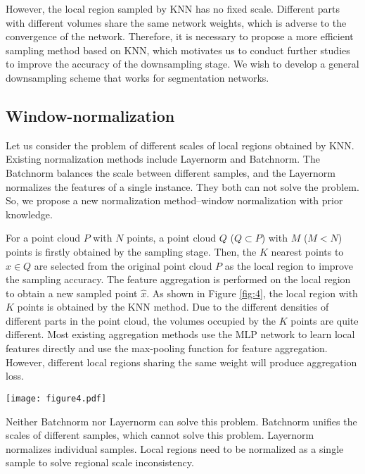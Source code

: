\documentclass[10pt,twocolumn,letterpaper]{article}
\begin{document}
        However, the local region sampled by KNN has no fixed scale. Different parts with different volumes share the same network weights, which is adverse to the convergence of the network. Therefore, it is necessary to propose a more efficient sampling method based on KNN, which motivates us to conduct further studies to improve the accuracy of the downsampling stage. We wish to develop a general downsampling scheme that works for segmentation networks.

    \subsection{Window-normalization}
        Let us consider the problem of different scales of local regions obtained by KNN. Existing normalization methods include Layernorm and Batchnorm. The Batchnorm balances the scale between different samples, and the Layernorm normalizes the features of a single instance. They both can not solve the problem. So, we propose a new normalization method--window normalization with prior knowledge.

        For a point cloud $P$ with $N$ points, a point cloud $Q$ ($Q \subset P$) with $M$ ($M<N$) points is firstly obtained by the sampling stage. Then, the $K$ nearest points to $x \in Q$ are selected from the original point cloud $P$ as the local region to improve the sampling accuracy. The feature aggregation is performed on the local region to obtain a new sampled point ${\hat x} $. As shown in Figure \ref{fig:4}, the local region with $K$ points is obtained by the KNN method. Due to the different densities of different parts in the point cloud, the volumes occupied by the $K$ points are quite different. Most existing aggregation methods use the MLP network to learn local features directly and use the max-pooling function for feature aggregation. However, different local regions sharing the same weight will produce aggregation loss.
        \begin{figure*}[!htb]
        \centering
        \texttt{[image: figure4.pdf]}
        \caption{Apply KNN on point clouds with different point densities. Neighbors obtained in low-density regions have a larger volume but the volume is smaller in high-density regions. (a) Low-density region. (b) High-density region.}
        \label{fig:4}
        \end{figure*}

        Neither Batchnorm nor Layernorm can solve this problem. Batchnorm unifies the scales of different samples, which cannot solve this problem. Layernorm normalizes individual samples. Local regions need to be normalized as a single sample to solve regional scale inconsistency.
\end{document}
